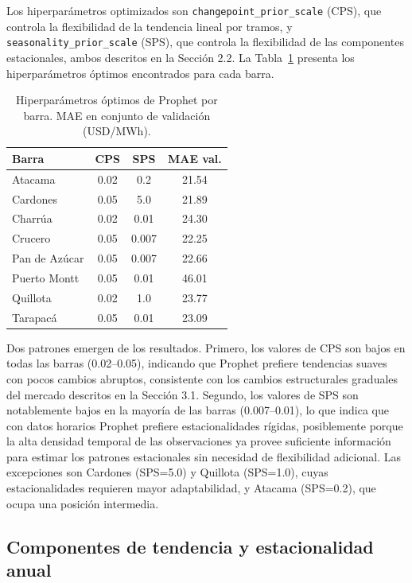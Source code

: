 Los hiperparámetros optimizados son \texttt{changepoint\_prior\_scale} (CPS), que controla la flexibilidad de la tendencia lineal por tramos, y \texttt{seasonality\_prior\_scale} (SPS), que controla la flexibilidad de las componentes estacionales, ambos descritos en la Sección 2.2. La Tabla~\ref{tab:prophet_params} presenta los hiperparámetros óptimos encontrados para cada barra.

\begin{table}[htbp]
    \centering
    \begin{tabular}{lccc}
        \toprule
        Barra & CPS & SPS & MAE val. \\
        \midrule
        Atacama       & 0.02 & 0.2   & 21.54 \\
        Cardones      & 0.05 & 5.0   & 21.89 \\
        Charrúa       & 0.02 & 0.01  & 24.30 \\
        Crucero       & 0.05 & 0.007 & 22.25 \\
        Pan de Azúcar & 0.05 & 0.007 & 22.66 \\
        Puerto Montt  & 0.05 & 0.01  & 46.01 \\
        Quillota      & 0.02 & 1.0   & 23.77 \\
        Tarapacá      & 0.05 & 0.01  & 23.09 \\
        \bottomrule
    \end{tabular}
    \vspace{0.2cm}
    \caption{Hiperparámetros óptimos de Prophet por barra. MAE en conjunto de validación (USD/MWh).}
    \label{tab:prophet_params}
\end{table}

Dos patrones emergen de los resultados. Primero, los valores de CPS son bajos en todas las barras (0.02--0.05), indicando que Prophet prefiere tendencias suaves con pocos cambios abruptos, consistente con los cambios estructurales graduales del mercado descritos en la Sección 3.1. Segundo, los valores de SPS son notablemente bajos en la mayoría de las barras (0.007--0.01), lo que indica que con datos horarios Prophet prefiere estacionalidades rígidas, posiblemente porque la alta densidad temporal de las observaciones ya provee suficiente información para estimar los patrones estacionales sin necesidad de flexibilidad adicional. Las excepciones son Cardones (SPS=5.0) y Quillota (SPS=1.0), cuyas estacionalidades requieren mayor adaptabilidad, y Atacama (SPS=0.2), que ocupa una posición intermedia.

\subsection{Componentes de tendencia y estacionalidad anual}

